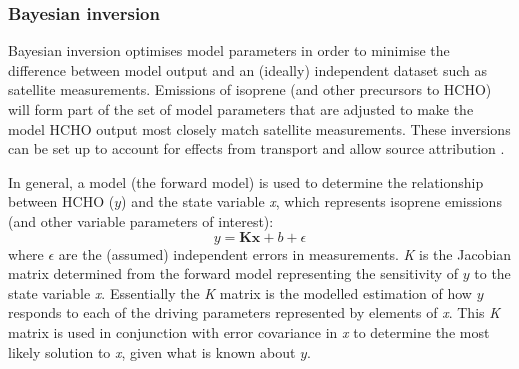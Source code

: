     
    
    
    \subsubsection{Bayesian inversion}
    
      Bayesian inversion optimises model parameters in order to minimise the difference between model output and an (ideally) independent dataset such as satellite measurements.
      Emissions of isoprene (and other precursors to HCHO) will form part of the set of model parameters that are adjusted to make the model HCHO output most closely match satellite measurements.
      These inversions can be set up to account for effects from transport and allow source attribution \parencite[e.g.,][]{Curci2010,FortemsCheiney2012}.
      
      In general, a model (the forward model) is used to determine the relationship between HCHO ($y$) and the state variable \emph{x}, which represents isoprene emissions (and other variable parameters of interest):
      \begin{equation}
        \label{BioIsop:intro:top_down_estimates:eqn_bayesian}
        y=\mathbf{Kx} + b + \epsilon
      \end{equation}
      where $\epsilon$ are the (assumed) independent errors in measurements.
      \emph{K} is the Jacobian matrix determined from the forward model representing the sensitivity of $y$ to the state variable \emph{x}.
      Essentially the \emph{K} matrix is the modelled estimation of how $y$ responds to each of the driving parameters represented by elements of \emph{x}.
      This \emph{K} matrix is used in conjunction with error covariance in \emph{x} to determine the most likely solution to \emph{x}, given what is known about $y$. %
      
